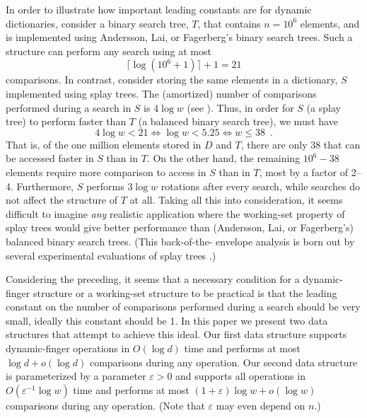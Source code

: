 \documentclass{patmorin}
\newcommand{\eps}{\varepsilon}
\begin{document}
In order to illustrate how important leading constants are for dynamic
dictionaries, consider a binary search tree, $T$, that contains $n=10^6$
elements, and is implemented using Andersson, Lai, or Fagerberg's binary
search trees.  Such a structure can perform any search using at most
\[
   \lceil\log(10^6+1)\rceil+1= 21
\]
comparisons.  In contrast, consider storing the same elements in
a dictionary, $S$ implemented using splay trees.  The (amortized)
number of comparisons performed during a search in $S$ is $4\log w$
(see ).  Thus, in order for $S$ (a splay tree)
to perform faster than $T$ (a balanced binary search tree), we must have
\[
   4\log w < 21 
       \Leftrightarrow \log w < 5.25 
       \Leftrightarrow w \le 38 \enspace .
\]
That is, of the one million elements stored in $D$ and $T$, there are
only 38 that can be accessed faster in $S$ than in $T$.  On the other
hand, the remaining $10^6 - 38$ elements require more comparison to
access in $S$ than in $T$, most by a factor of 2--4.  Furthermore, $S$
performs $3\log w$ rotations after every search, while searches do not
affect the structure of $T$ at all.  Taking all this into consideration,
it seems difficult to imagine \emph{any} realistic application where
the working-set property of splay trees would give better performance
than (Andersson, Lai, or Fagerberg's) balanced binary search trees.
(This back-of-the- envelope analysis is born out by several experimental
evaluations of splay trees \cite{X,X,X}.)

Considering the preceding, it seems that a necessary condition for a
dynamic-finger structure or a working-set structure to be practical is
that the leading constant on the number of comparisons performed during a
search should be very small, ideally this constant should be 1.  In this
paper we present two data structures that attempt to achieve this ideal.
Our first data structure supports dynamic-finger operations in $O(\log
d)$ time and performs at most $\log d+o(\log d)$ comparisons during any
operation. Our second data structure is parameterized by a parameter $\eps
>0$ and supports all operations in $O(\eps^{-1}\log w)$ time and performs
at most $(1+\eps)\log w+o(\log w)$ comparisons during any operation.
(Note that $\eps$ may even depend on $n$.)
\end{document}
